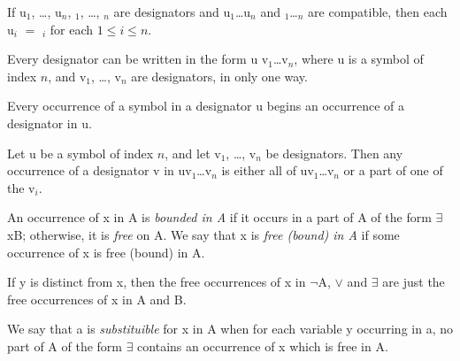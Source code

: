 \begin{lemma}
	If \synt u$_1$, \dots, \synt u$_n$, $_1$, \dots, $_n$ are designators
	and \synt u$_1$\dots\synt u$_n$ and $_1$\dots{}$_n$ are compatible,
	then each \synt u$_i$ $=$ $_i$ for each $1 \le i \le n$.
\end{lemma}

\begin{theorem}
	Every designator can be written in the form \synt u \synt v$_1$\dots\synt v$_n$, 
	where \synt u is a symbol of index $n$, and \synt v$_1$, \dots, \synt v$_n$ are designators,
	in only one way.
\end{theorem}

\begin{lemma}
	Every occurrence of a symbol in a designator \synt u begins an occurrence of a designator
	in \synt u.
\end{lemma}

\begin{theorem}
	Let \synt u be a symbol of index $n$, and let \synt v$_1$, \dots, \synt v$_n$
	be designators. Then any occurrence of a designator \synt v in 
	\synt u\synt v$_1$\dots\synt v$_n$ is either all of \synt u\synt v$_1$\dots\synt v$_n$
	or a part of one of the \synt v$_i$.
\end{theorem}

\begin{definition}
	An occurrence of \synt x in \synt A is \emph{bounded in \synt A} if it occurs in a part
	of \synt A of the form $\exists$\synt x\synt B; otherwise, it is \emph{free} on \synt A.
	We say that \synt x is \emph{free (bound) in \synt A} if some occurrence of \synt x
	is free (bound) in \synt A.
\end{definition}

\begin{fact}
	If \synt y is distinct from \synt x, then the free occurrences of \synt x in $\lnot$\synt A,
	$\lor$ and $\exists$ are just the free occurrences of \synt x in \synt A
	and \synt B.
\end{fact}

\begin{definition}[Substituibleness]
	We say that \synt a is \emph{substituible} for \synt x in \synt A when for each
	variable \synt y occurring in \synt a, no part of \synt A of the form $\exists$
	contains an occurrence of \synt x which is free in \synt A.
\end{definition}

